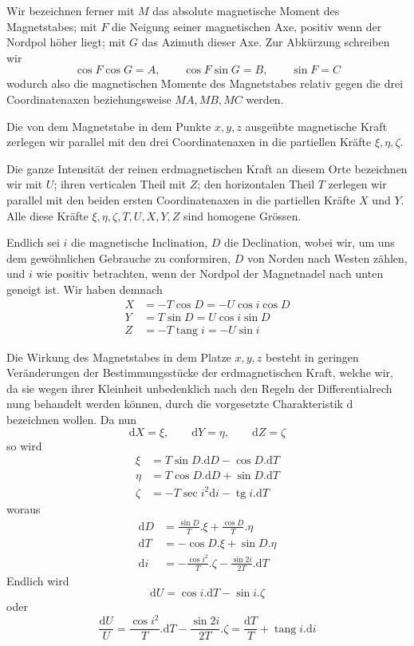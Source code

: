 Wir bezeichnen ferner mit $M$ das absolute magnetische Moment des Magnetstabes; mit $F$ die Neigung seiner magnetischen Axe, positiv wenn der Nordpol höher liegt; mit $G$ das Azimuth dieser Axe. Zur Abkürzung schreiben wir
\[
\cos F\cos G=A,\qquad\cos F\sin G=B,\qquad\sin F=C
\]
wodurch also die magnetischen Momente des Magnetstabes relativ gegen die drei Coordinatenaxen beziehungsweise $MA,MB,MC$ werden.

Die von dem Magnetstabe in dem Punkte $x,y,z$ ausgeübte magnetische Kraft zerlegen wir parallel mit den drei Coordinatenaxen in die partiellen Kräfte $\xi,\eta,\zeta$.

Die ganze Intensität der reinen erdmagnetischen Kraft an diesem Orte bezeichnen wir mit $U$; ihren verticalen Theil mit $Z$; den horizontalen Theil $T$ zerlegen wir parallel mit den beiden ersten Coordinatenaxen in die partiellen Kräfte $X$ und $Y$. Alle diese Kräfte $\xi,\eta,\zeta,T,U,X,Y,Z$ sind homogene Grössen.

Endlich sei $i$ die magnetische Inclination, $D$ die Declination, wobei wir, um uns dem gewöhnlichen Gebrauche zu conformiren, $D$ von Norden nach Westen zählen, und $i$ wie positiv betrachten, wenn der Nordpol der Magnetnadel nach unten geneigt ist. Wir haben demnach
\[
\begin{aligned}
X&=-T\cos D=-U\cos i\cos D\\
Y&=T\sin D=U\cos i\sin D\\
Z&=-T\operatorname{tang}i=-U\sin i
\end{aligned}
\]

Die Wirkung des Magnetstabes in dem Platze $x,y,z$ besteht in geringen Veränderungen der Bestimmungsstücke der erdmagnetischen Kraft, welche wir, da sie wegen ihrer Kleinheit unbedenklich nach den Regeln der Differentialrech%
nung behandelt werden können, durch die vorgesetzte Charakteristik $\mathrm{d}$ bezeichnen wollen. Da nun
\[
\mathrm{d}X=\xi,\qquad\mathrm{d}Y=\eta,\qquad\mathrm{d}Z=\zeta
\]
so wird
\[
\begin{aligned}
\xi&=T\sin D.\mathrm{d}D-\cos D.\mathrm{d}T\\
\eta&=T\cos D.\mathrm{d}D+\sin D.\mathrm{d}T\\
\zeta&=-T\sec i^2\mathrm{d}i-\operatorname{tg}i.\mathrm{d}T
\end{aligned}
\]
woraus
\[
\begin{aligned}
\mathrm{d}D&=\frac{\sin D}{T}.\xi+\frac{\cos D}{T}.\eta\\
\mathrm{d}T&=-\cos D.\xi+\sin D.\eta\\
\mathrm{d}i&=-\frac{\cos i^2}{T}.\zeta-\frac{\sin2i}{2T}.\mathrm{d}T
\end{aligned}
\]
Endlich wird
\[
\mathrm{d}U=\cos i.\mathrm{d}T-\sin i.\zeta
\]
oder
\[
\frac{\mathrm{d}U}{U}=\frac{\cos i^2}{T}.\mathrm{d}T-\frac{\sin2i}{2T}.\zeta=\frac{\mathrm{d}T}{T}+\operatorname{tang}i.\mathrm{d}i
\]

